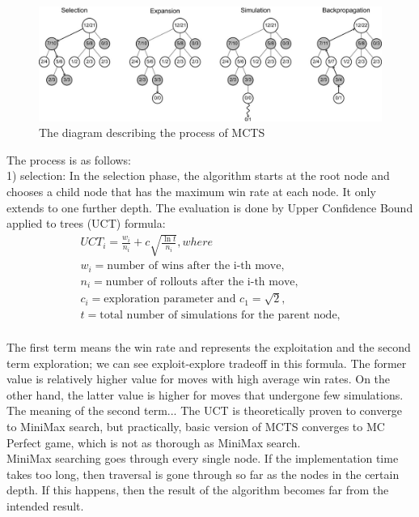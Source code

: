 \documentclass[11pt]{article}
\begin{document}
\begin{figure}
  \centering
  \includegraphics[width=\linewidth]{MCTS_pic1.jpg}
  \caption{The diagram describing the process of MCTS}
  \label{fig:MCTSdia}
\end{figure}

The process is as follows:\\


	1) selection: 
	In the selection phase, the algorithm starts at the root node and chooses a child node that has the maximum win rate at each node. It only extends to one further depth. The evaluation is done by Upper Confidence Bound applied to trees (UCT) formula:
\begin{equation}
\begin{aligned}
	UCT_i = \frac{w_i}{n_i}+c\sqrt{\frac{\ln{t}}{n_i}}, where\\
	w_i = \text{number of wins after the i-th move,}\\
	n_i = \text{number of rollouts after the i-th move,}\\
	c_i = \text{exploration parameter and }c_1= \sqrt{2},\\
	t = \text{total number of simulations for the parent node,}\\
\end{aligned}
\end{equation}
	
	The first term means the win rate and represents the exploitation and the second term exploration; we can see exploit-explore tradeoff in this formula. The former value is relatively higher value for moves with high average win rates. On the other hand, the latter value is higher for moves that undergone few simulations. %
The meaning of the second term...
	The UCT is theoretically proven to converge to MiniMax search, but practically, basic version of MCTS converges to MC Perfect game, which is not as thorough as MiniMax search.\\
	MiniMax searching goes through every single node. If the implementation time takes too long, then traversal is gone through so far as the nodes in the certain depth. If this happens, then the result of the algorithm becomes far from the intended result.
\end{document}
